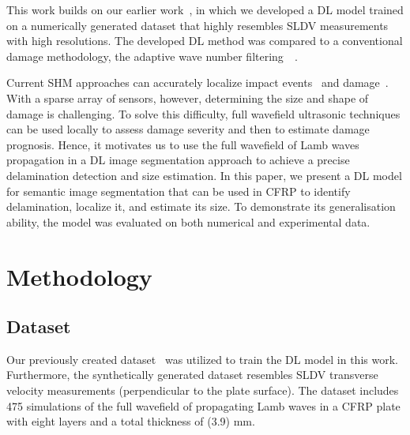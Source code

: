 \documentclass[runningheads]{llncs}
\begin{document}
This work builds on our earlier work~\cite{Ijjeh2021}, in which we developed a DL model trained on a numerically generated dataset that highly resembles SLDV measurements with high resolutions.
The developed DL method was compared to a conventional damage methodology, the adaptive wave number filtering~\cite{Kudela2015}~\cite{Radzienski2019a}.

Current SHM approaches can accurately localize impact events~\cite{Ciampa2012} and damage~\cite{Nokhbatolfoghahai2020}.
With a sparse array of sensors, however, determining the size and shape of damage is challenging.
To solve this difficulty, full wavefield ultrasonic techniques can be used locally to assess damage severity and then to estimate damage prognosis.
Hence, it motivates us to use the full wavefield of Lamb waves propagation in a DL image segmentation approach to achieve a precise delamination detection and size estimation.
In this paper, we present a DL model for semantic image segmentation that can be used in CFRP to identify delamination, localize it, and estimate its size.
To demonstrate its generalisation ability, the model was evaluated on both numerical and experimental data.
\section{Methodology}
\label{methodology}
\subsection{Dataset}
Our previously created dataset~\cite{Ijjeh2021} was utilized to train the DL model in this work.
Furthermore, the synthetically generated dataset resembles SLDV transverse velocity measurements (perpendicular to the plate surface).
The dataset includes 475 simulations of the full wavefield of propagating Lamb waves in a CFRP plate with eight layers and a total thickness of (3.9) mm.
\end{document}
